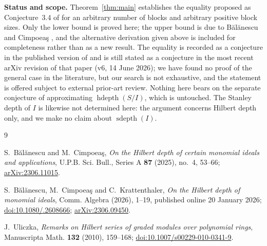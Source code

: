 \documentclass[11pt]{amsart}
\newcommand{\hdepth}{\operatorname{hdepth}}
\begin{document}
\medskip
\noindent\textbf{Status and scope.}
Theorem~\ref{thm:main} establishes the equality proposed as Conjecture~3.4 of
\cite{BC} for an arbitrary number of blocks and arbitrary positive block
sizes. Only the lower bound is proved here; the upper bound is due to
B\u{a}l\u{a}nescu and Cimpoea\c{s} \cite[Theorem~3.3]{BC}, and the
alternative derivation given above is included for completeness rather than
as a new result. The equality is recorded as a conjecture in the published
version of \cite{BC} and is still stated as a conjecture in the most recent
arXiv revision of that paper (v6, 14 June 2026); we have found no proof of
the general case in the literature, but our search is not exhaustive, and the
statement is offered subject to external prior-art review. Nothing here bears
on the separate conjecture of \cite{BC} approximating $\hdepth(S/I)$, which is
untouched. The Stanley depth of $I$ is likewise not determined here: the
argument concerns Hilbert depth only, and we make no claim about
$\operatorname{sdepth}(I)$.

\begin{thebibliography}{9}

S.~B\u{a}l\u{a}nescu and M.~Cimpoea\c{s},
\emph{On the Hilbert depth of certain monomial ideals and applications},
U.P.B. Sci. Bull., Series A \textbf{87} (2025), no.~4, 53--66;
\href{https://arxiv.org/abs/2306.11015}{arXiv:2306.11015}.

S.~B\u{a}l\u{a}nescu, M.~Cimpoea\c{s} and C.~Krattenthaler,
\emph{On the Hilbert depth of monomial ideals},
Comm. Algebra (2026), 1--19, published online 20 January 2026;
\href{https://doi.org/10.1080/00927872.2025.2608666}
{doi:10.1080/.2608666};
\href{https://arxiv.org/abs/2306.09450}{arXiv:2306.09450}.

J.~Uliczka,
\emph{Remarks on Hilbert series of graded modules over polynomial rings},
Manuscripta Math. \textbf{132} (2010), 159--168;
\href{https://doi.org/10.1007/s00229-010-0341-9}
{doi:10.1007/s00229-010-0341-9}.

\end{thebibliography}
\end{document}

